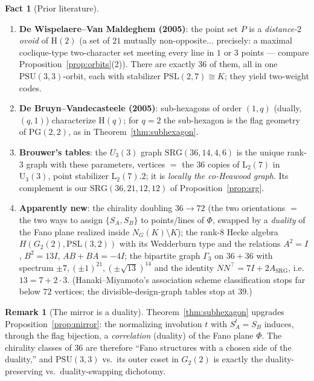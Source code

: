 \documentclass[11pt]{article}
\theoremstyle{definition}
\newtheorem{remark}[theorem]{Remark}
\newtheorem{fact}[theorem]{Fact}
\newcommand{\PG}{\mathrm{PG}}
\newcommand{\PSL}{\mathrm{PSL}}
\newcommand{\PSU}{\mathrm{PSU}}
\begin{document}
\begin{fact}[Prior literature]\label{fact:priorart}
\begin{enumerate}
\item \textbf{De Wispelaere--Van Maldeghem (2005)}: the point set $P$ is a
\emph{distance-$2$ ovoid} of $\mathrm H(2)$ (a set of $21$ mutually
non-opposite... precisely: a maximal coclique-type two-character set
meeting every line in $1$ or $3$ points --- compare
Proposition~\ref{prop:orbits}(2)). There are exactly $36$ of them, all in
one $\PSU(3,3)$-orbit, each with stabilizer $\PSL(2,7) \cong K$; they
yield two-weight codes.
\item \textbf{De Bruyn--Vandecasteele (2005)}: sub-hexagons of order
$(1,q)$ (dually, $(q,1)$) characterize $\mathrm H(q)$; for $q=2$ the
sub-hexagon is the flag geometry of $\PG(2,2)$, as in
Theorem~\ref{thm:subhexagon}.
\item \textbf{Brouwer's tables}: the $U_3(3)$ graph
$\mathrm{SRG}(36,14,4,6)$ is the unique rank-$3$ graph with these
parameters, vertices $=$ the $36$ copies of $\mathrm L_2(7)$ in
$\mathrm U_3(3)$, point stabilizer $\mathrm L_2(7){.}2$; it is
\emph{locally the co-Heawood graph}. Its complement is our
$\mathrm{SRG}(36,21,12,12)$ of Proposition~\ref{prop:srg}.
\item \textbf{Apparently new}: the chirality doubling $36 \to 72$ (the two
orientations $=$ the two ways to assign $\{S_A,S_B\}$ to
points/lines of $\Phi$, swapped by a \emph{duality} of the Fano plane
realized inside $N_G(K)\setminus K$); the rank-$8$ Hecke algebra
$H(G_2(2), \PSL(3,2))$ with its Wedderburn type and the relations
$A^2{=}I$, $B^2{=}13I$, $AB{+}BA{=}-4I$; the bipartite graph $\Gamma_3$ on
$36+36$ with spectrum $\pm7, (\pm1)^{21}, (\pm\sqrt{13})^{14}$ and the
identity $NN^\top = 7I + 2A_{\mathrm{SRG}}$, i.e.\ $13 = 7 + 2\cdot 3$.
(Hanaki--Miyamoto's association scheme classification stops far below
$72$ vertices; the divisible-design-graph tables stop at $39$.)
\end{enumerate}
\end{fact}

\begin{remark}[The mirror is a duality]
Theorem~\ref{thm:subhexagon} upgrades Proposition~\ref{prop:mirror}: the
normalizing involution $t$ with $S_A^t = S_B$ induces, through the flag
bijection, a \emph{correlation} (duality) of the Fano plane $\Phi$. The
chirality classes of $36$ are therefore ``Fano structures with a chosen
side of the duality,'' and $\PSU(3,3)$ vs.\ its outer coset in $G_2(2)$
is exactly the duality-preserving vs.\ duality-swapping dichotomy.
\end{remark}
\end{document}

